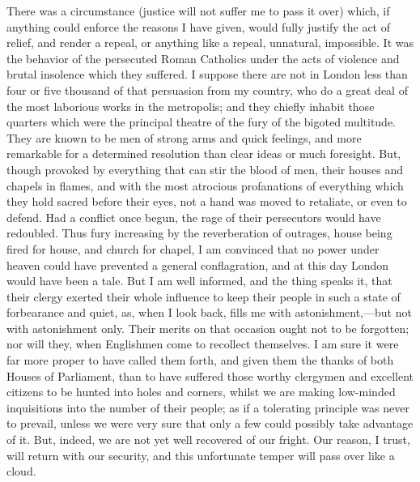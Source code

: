 There was a circumstance (justice will not suffer me to pass it over) which, if anything could enforce the reasons I have given, would fully justify the act of relief, and render a repeal, or anything like a repeal, unnatural, impossible. It was the behavior of the persecuted Roman Catholics under the acts of violence and brutal insolence which they suffered. I suppose there are not in London less than four or five thousand of that persuasion from my country, who do a great deal of the most laborious works in the metropolis; and they chiefly inhabit those quarters which were the principal theatre of the fury of the bigoted multitude. They are known to be men of strong arms and quick feelings, and more remarkable for a determined resolution than clear ideas or much foresight. But, though provoked by everything that can stir the blood of men, their houses and chapels in flames, and with the most atrocious profanations of everything which they hold sacred before their eyes, not a hand was moved to retaliate, or even to defend. Had a conflict once begun, the rage of their persecutors would have redoubled. Thus fury increasing by the reverberation of outrages, house being fired for house, and church for chapel, I am convinced that no power under heaven could have prevented a general conflagration, and at this day London would have been a tale. But I am well informed, and the thing speaks it, that their clergy exerted their whole influence to keep their people in such a state of forbearance and quiet, as, when I look back, fills me with astonishment,—but not with astonishment only. Their merits on that occasion ought not to be forgotten; nor will they, when Englishmen come to recollect themselves. I am sure it were far more proper to have called them forth, and given them the thanks of both Houses of Parliament, than to have suffered those worthy clergymen and excellent citizens to be hunted into holes and corners, whilst we are making low-minded inquisitions into the number of their people; as if a tolerating principle was never to prevail, unless we were very sure that only a few could possibly take advantage of it. But, indeed, we are not yet well recovered of our fright. Our reason, I trust, will return with our security, and this unfortunate temper will pass over like a cloud.

